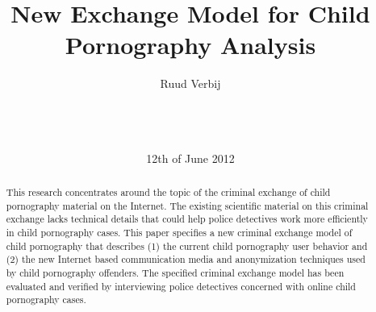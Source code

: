 \documentclass{sig-alternate-br}
\begin{document}
%

\title{New Exchange Model for Child Pornography Analysis}

\author{
\alignauthor
Ruud Verbij \\
       \\
       \\
       \\
}
\date{12th of June 2012}

\maketitle
\begin{abstract}
This research concentrates around the topic of the criminal exchange of child pornography material on the Internet. The existing scientific material on this criminal exchange lacks technical details that could help police detectives work more efficiently in child pornography cases. This paper specifies a new criminal exchange model of child pornography that describes (1) the current child pornography user behavior and (2) the new Internet based communication media and anonymization techniques used by child pornography offenders. The specified criminal exchange model has been evaluated and verified by interviewing police detectives concerned with online child \\pornography cases.
\end{abstract}

\end{document}
